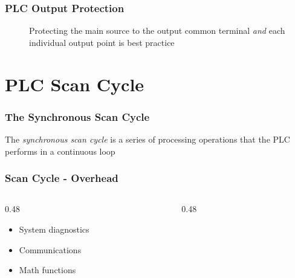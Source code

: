\begin{frame}
    \frametitle{PLC Output Protection}

    \begin{figure}
        \centering
        \resizebox{0.375\linewidth}{!}{
            
        }

        \vspace{0.5em}
        {\footnotesize Protecting the main source to the output common terminal \emph{and} each individual output point is best practice\par}
    \end{figure}
\end{frame}

\section{PLC Scan Cycle}

\begin{frame}
    \frametitle{The Synchronous Scan Cycle}

    \begin{figure}
        \centering
        \resizebox{0.375\linewidth}{!}{
            
        }
    \end{figure}

    \vspace{0.5em}
    \centering
    {\footnotesize The \emph{synchronous scan cycle} is a series of processing operations that the PLC performs in a continuous loop\par}
\end{frame}

\begin{frame}
    \frametitle{Scan Cycle - Overhead}

    \begin{columns}
        \begin{column}{0.48\linewidth}
            \begin{itemize}
                \item System diagnostics
                \item Communications
                \item Math functions
            \end{itemize}
        \end{column}
        \begin{column}{0.48\linewidth}
            \begin{figure}
                \centering
                \resizebox{0.9\columnwidth}{!}{
                    
                }
            \end{figure}
        \end{column}
    \end{columns}
\end{frame}

